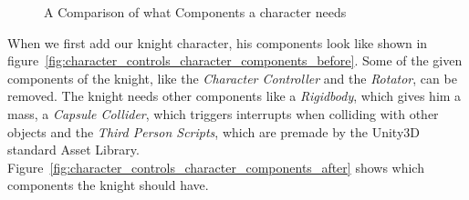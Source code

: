 \documentclass[12pt, a4paper, titlepage]{article}
\begin{document}
\begin{figure}[H]
  \begin{center}
    \hspace{0.5in}
  \end{center}
  \caption{A Comparison of what Components a character needs}
  \label{fig:character_controls_character_components}
\end{figure}

When we first add our knight character, his components look like shown in  figure~\ref{fig:character_controls_character_components_before}. Some of the given components of the knight, like the \emph{Character Controller} and the \emph{Rotator}, can be removed. The knight needs other components like a \emph{Rigidbody}, which gives him a mass, a \emph{Capsule Collider}, which triggers interrupts when colliding with other objects and the \emph{Third Person Scripts}, which are premade by the Unity3D standard Asset Library. Figure~\ref{fig:character_controls_character_components_after} shows which components the knight should have.
\end{document}
